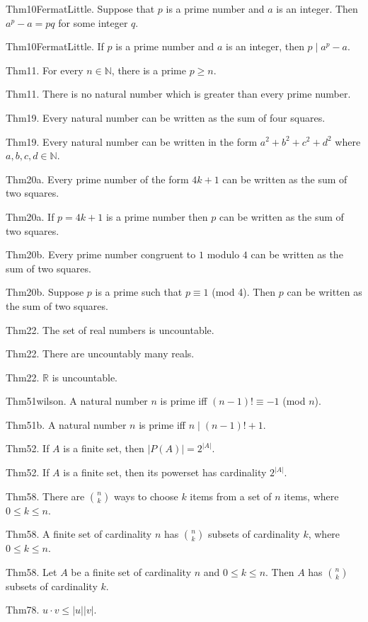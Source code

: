 \documentclass{report}
\begin{document}
Thm10FermatLittle. Suppose that $p$ is a prime number and $a$ is an integer. Then $a^p - a = pq$ for some integer $q$.

Thm10FermatLittle. If $p$ is a prime number and $a$ is an integer, then $p \mid a^p - a$.

Thm11. For every $n \in \mathbb{N}$, there is a prime $p \geq n$.

Thm11. There is no natural number which is greater than every prime number.

Thm19. Every natural number can be written as the sum of four squares.

Thm19. Every natural number can be written in the form $a^2+b^2+c^2+d^2$ where $a, b, c, d \in \mathbb{N}$.

Thm20a. Every prime number of the form $4k+1$ can be written as the sum of two squares.

Thm20a. If $p=4k+1$ is a prime number then $p$ can be written as the sum of two squares.

Thm20b. Every prime number congruent to $1$ modulo $4$ can be written as the sum of two squares.

Thm20b. Suppose $p$ is a prime such that $p \equiv 1$ (mod 4). Then $p$ can be written as the sum of two squares.

Thm22. The set of real numbers is uncountable.

Thm22. There are uncountably many reals.

Thm22. $\mathbb{R}$ is uncountable.

Thm51wilson. A natural number $n$ is prime iff $(n-1)! \equiv -1$ (mod $n$).

Thm51b. A natural number $n$ is prime iff $n \mid (n-1)! + 1$.

Thm52. If $A$ is a finite set, then $\lvert P(A) \rvert = 2^{\lvert A \rvert}$.

Thm52. If $A$ is a finite set, then its powerset has cardinality $2^{\lvert A \rvert}$.

Thm58. There are $\binom{n}{k}$ ways to choose $k$ items from a set of $n$ items, where $0 \leq k \leq n$.

Thm58. A finite set of cardinality $n$ has $\binom{n}{k}$ subsets of cardinality $k$, where $0 \leq k \leq n$.

Thm58. Let $A$ be a finite set of cardinality $n$ and $0 \leq k \leq n$. Then $A$ has $\binom{n}{k}$ subsets of cardinality $k$.

Thm78. $u \cdot v \leq \lvert u \rvert \lvert v \rvert$.
\end{document}

